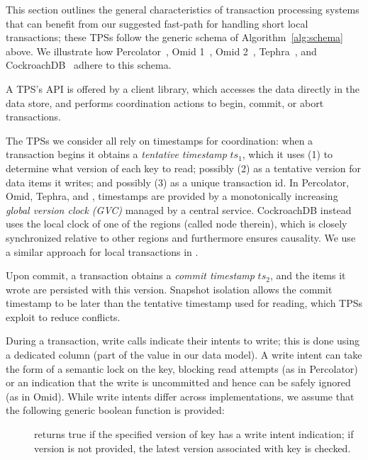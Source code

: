 
This section outlines the general characteristics of transaction processing systems that can benefit from our 
suggested fast-path for handling short local transactions; these TPSs follow the generic schema of Algorithm~\ref{alg:schema} above. 
We illustrate how 
Percolator~\cite{Percolator2010}, Omid 1~\cite{OmidICDE2014}, Omid 2~\cite{omid-blog}, 
Tephra~\cite{tephra}, and CockroachDB~\cite{cockroach} adhere to this schema.

A TPS's API is offered by a client library, which accesses the data directly in the data store, and 
performs coordination actions to begin, commit, or abort transactions. 

The TPSs we consider all rely on timestamps for coordination: when a transaction begins it obtains a \emph{tentative timestamp} $ts_1$, 
which it uses (1) to determine what version of each key to read; possibly (2) as a tentative version for data items it writes; and possibly (3) as a unique transaction id.   
In Percolator, Omid, Tephra, and \sys, timestamps are provided by a monotonically
increasing \emph{global version  clock (GVC)} managed by a central service. 
CockroachDB instead uses the local clock of
one of the regions (called node therein), which is closely synchronized relative to other regions and furthermore ensures causality.
We use a similar approach for local transactions in \sys.

Upon commit, a transaction obtains a \emph{commit timestamp} $ts_2$, and the items it wrote are persisted with this version.
Snapshot isolation allows the commit timestamp to be later than the tentative timestamp used for reading, 
which TPSs exploit to reduce conflicts.

During a transaction, write calls indicate their intents to write; this is done using
a dedicated column (part of the value in our data model).
A write intent can take the form of a semantic lock on the key, blocking read attempts (as in Percolator) or
an indication that the write is uncommitted and hence can be safely ignored (as in Omid). 
While write intents differ across implementations, we assume that the following generic boolean function is  provided:
\begin{description}
\item[] returns true if the specified version of key has a write intent indication; if version is not provided, the 
latest version associated with key is checked.
\end{description}

